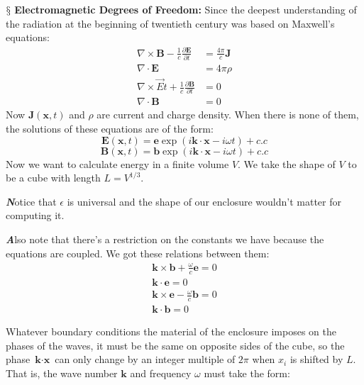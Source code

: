 \documentclass[9pt,a4paper, twocolumn]{article}
\newenvironment{callout}
	{\begin{calloutbox}\color{charcoal}\textbf\textit}
	{\end{calloutbox}}
\newcommand{\newpoint}[1]{\ \\ \indent$\mathsection$ \textbf{#1}}
\newcommand{\curl}{\nabla\times}
\newcommand{\diver}{\nabla\cdot}
\newcommand{\vect}[1]{\textbf{#1}}
\begin{document}
        \\
        \newpoint{Electromagnetic Degrees of Freedom:} Since the deepest understanding of the radiation at the beginning of twentieth century was based on Maxwell's equations:
        \begin{align}
            \curl \vect B - \frac1c \frac{\partial \vect E}{\partial t} &= \frac{4\pi}{c}\vect J \\
            \diver \vect E &= 4\pi\rho\\
            \curl \vec Et + \frac1c\frac{\partial \vect B}{\partial t} &= 0 \\
            \diver \vect B &= 0
        \end{align}
        Now $\vect J(\vect x, t)$ and $\rho$ are current and charge density. When there is none of them, the solutions of these equations are of the form:
        \begin{equation}
            \vect E(\vect x, t) = \vect e \exp(i\vect k \cdot \vect x - i\omega t) + c.c
        \end{equation}
        \begin{equation}
            \vect B(\vect x, t) = \vect b \exp(i\vect k \cdot \vect x - i\omega t) + c.c
        \end{equation}
        Now we want to calculate energy in a finite volume $V$. We take the shape of $V$ to be a cube with length $L = V^{1/3}$.
        \begin{callout}
            Notice that $\epsilon$ is universal and the shape of our enclosure wouldn't matter for computing it.
        \end{callout}
        \begin{callout}
            Also note that there's a restriction on the constants we have because the equations are coupled. We got these relations between them:
            \begin{align*}
                \vect k\times\vect b + \frac\omega c \vect e = 0\\
                \vect k\cdot\vect e = 0\\
                \vect k\times\vect e - \frac\omega c \vect b = 0 \\
                \vect k \cdot \vect b = 0
            \end{align*}
        \end{callout}
        Whatever boundary conditions the material of the enclosure imposes on the phases of the waves, it must be the same on opposite sides of the cube, so the phase $\vect k \cdot \vect x$ can only change by an integer multiple of $2\pi$ when $x_i$ is shifted by $L$. That is, the wave number $\vect k$ and frequency $\omega$ must take the form:
\end{document}
